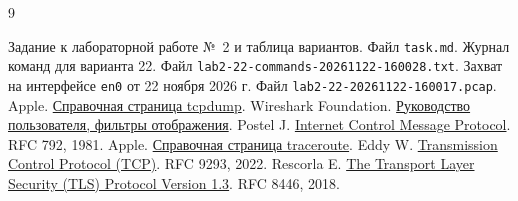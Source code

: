 \documentclass[a4paper,14pt]{extarticle}
\begin{document}
\renewcommand{\refname}{Список источников}
{}
\begin{thebibliography}{9}
  \raggedright
   Задание к лабораторной работе №~2 и таблица вариантов. Файл \nolinkurl{task.md}.
   Журнал команд для варианта 22. Файл \nolinkurl{lab2-22-commands-20261122-160028.txt}.
   Захват на интерфейсе \texttt{en0} от 22 ноября 2026 г. Файл \nolinkurl{lab2-22-20261122-160017.pcap}.
   Apple. \href{https://github.com/apple-oss-distributions/tcpdump/blob/main/tcpdump/tcpdump.1}{Справочная страница tcpdump}.
   Wireshark Foundation. \href{https://www.wireshark.org/docs/wsug_html_chunked/ChWorkDisplayFilterSection.html}{Руководство пользователя, фильтры отображения}.
   Postel J. \href{https://www.rfc-editor.org/rfc/rfc792.html}{Internet Control Message Protocol}. RFC 792, 1981.
   Apple. \href{https://github.com/apple-oss-distributions/network_cmds/blob/main/traceroute.tproj/traceroute.8}{Справочная страница traceroute}.
   Eddy W. \href{https://www.rfc-editor.org/rfc/rfc9293.html}{Transmission Control Protocol (TCP)}. RFC 9293, 2022.
   Rescorla E. \href{https://www.rfc-editor.org/rfc/rfc8446.html}{The Transport Layer Security (TLS) Protocol Version 1.3}. RFC 8446, 2018.
\end{thebibliography}
\end{document}
